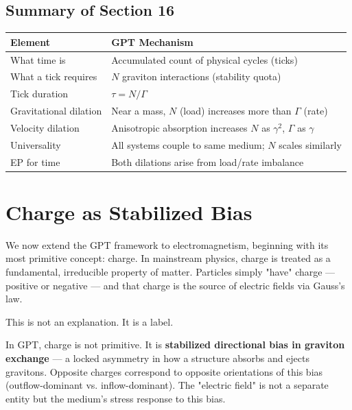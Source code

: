 \documentclass[12pt, a4paper]{article}
\begin{document}
\subsection{Summary of Section 16}
\label{subsec:summary_16}

\begin{center}
\begin{tabular}{|p{4cm}|p{10cm}|}
\hline
\textbf{Element} & \textbf{GPT Mechanism} \\
\hline
What time is & Accumulated count of physical cycles (ticks) \\
\hline
What a tick requires & \( N \) graviton interactions (stability quota) \\
\hline
Tick duration & \( \tau = N/\Gamma \) \\
\hline
Gravitational dilation & Near a mass, \( N \) (load) increases more than \( \Gamma \) (rate) \\
\hline
Velocity dilation & Anisotropic absorption increases \( N \) as \( \gamma^2 \), \( \Gamma \) as \( \gamma \) \\
\hline
Universality & All systems couple to same medium; \( N \) scales similarly \\
\hline
EP for time & Both dilations arise from load/rate imbalance \\
\hline
\end{tabular}
\end{center}

\section{Charge as Stabilized Bias}
\label{sec:charge_bias}

We now extend the GPT framework to electromagnetism, beginning with its most primitive concept: charge. In mainstream physics, charge is treated as a fundamental, irreducible property of matter. Particles simply "have" charge — positive or negative — and that charge is the source of electric fields via Gauss's law.

This is not an explanation. It is a label.

In GPT, charge is not primitive. It is \textbf{stabilized directional bias in graviton exchange} — a locked asymmetry in how a structure absorbs and ejects gravitons. Opposite charges correspond to opposite orientations of this bias (outflow-dominant vs. inflow-dominant). The "electric field" is not a separate entity but the medium's stress response to this bias.
\end{document}
